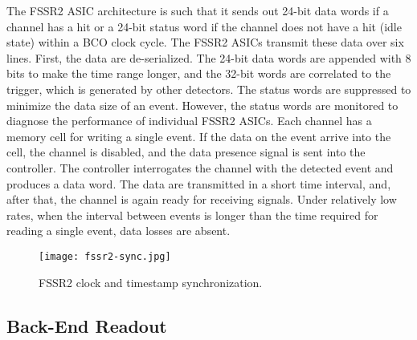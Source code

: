 The FSSR2 ASIC architecture is such that it sends out 24-bit data words if a channel has a hit or a 24-bit status word if the channel does not have a hit (idle state) within a BCO clock cycle. The FSSR2 ASICs transmit these data over six lines. First, the data are de-serialized. The 24-bit data words are appended with 8 bits to make the time range longer, and the 32-bit words are correlated to the trigger, which is generated by other detectors. The status words are suppressed to minimize the data size of an event. However, the status words are monitored to diagnose the performance of individual FSSR2 ASICs. Each channel has a memory cell for writing a single event. If the data on the event arrive into the cell, the channel is disabled, and the data presence signal is sent into the controller. The controller interrogates the channel with the detected event and produces a data word. The data are transmitted in a short time interval, and, after that, the channel is again ready for receiving signals. Under relatively low rates, when the interval between events is longer than the time required for reading a single event, data losses are absent. 

\begin{figure}[hbt] 
\centering 
\texttt{[image: fssr2-sync.jpg]}
\caption{FSSR2 clock and timestamp synchronization.}
\label{fig:fssr2-sync}
\end{figure}

\subsection{Back-End Readout}

